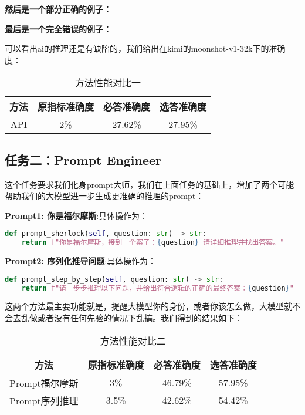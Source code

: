 \documentclass[answers]{exam}  %
\begin{document}
\textbf{然后是一个部分正确的例子：}

\textbf{最后是一个完全错误的例子：}

可以看出ai的推理还是有缺陷的，我们给出在kimi的moonshot-v1-32k下的准确度：

\begin{table}[h]
    \centering
    \begin{tabular}{cccc}
    \toprule
    \textbf{方法} & \textbf{原指标准确度} & \textbf{必答准确度} &\textbf{选答准确度}\\
    \midrule
    API & 2\% & 27.62\% & 27.95\% \\
    \bottomrule
    \end{tabular}
    \caption{方法性能对比一}
\end{table}


\subsection{任务二：Prompt Engineer}

这个任务要求我们化身prompt大师，我们在上面任务的基础上，增加了两个可能帮助我们的大模型进一步生成更准确的推理的prompt：

\textbf{Prompt1: 你是福尔摩斯}:具体操作为：
\begin{lstlisting}[language=python]
    def prompt_sherlock(self, question: str) -> str:
    return f"你是福尔摩斯，接到一个案子：{question} 请详细推理并找出答案。"
\end{lstlisting}

\textbf{Prompt2: 序列化推导问题}:具体操作为：
\begin{lstlisting}[language=python]
    def prompt_step_by_step(self, question: str) -> str:
    return f"请一步步推理以下问题，并给出符合逻辑的正确的最终答案：{question}"
\end{lstlisting}

这两个方法最主要功能就是，提醒大模型你的身份，或者你该怎么做，大模型就不会去乱做或者没有任何先验的情况下乱搞。我们得到的结果如下：

\begin{table}[h]
    \centering
    \begin{tabular}{cccc}
    \toprule
    \textbf{方法} & \textbf{原指标准确度} & \textbf{必答准确度} &\textbf{选答准确度}\\
    \midrule
    Prompt福尔摩斯 & 3\% & 46.79\% & 57.95\% \\
    \hline
    Prompt序列推理 & 3.5\% & 42.62\% & 54.42\% \\
    \bottomrule
    \end{tabular}
    \caption{方法性能对比二}
\end{table}
\end{document}

